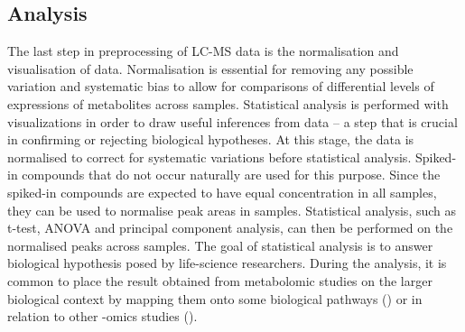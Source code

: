 

\subsection{Analysis}

The last step in preprocessing of LC-MS data is the normalisation and visualisation of data. Normalisation is essential for removing any possible variation and systematic bias to allow for comparisons of differential levels of expressions of metabolites across samples. Statistical analysis is performed with visualizations in order to draw useful inferences from data -- a step that is crucial in confirming or rejecting biological hypotheses. At this stage, the data is normalised to correct for systematic variations before statistical analysis. Spiked-in compounds that do not occur naturally are used for this purpose. Since the spiked-in compounds are expected to have equal concentration in all samples, they can be used to normalise peak areas in samples. Statistical analysis, such as t-test, ANOVA and principal component analysis, can then be performed on the normalised peaks across samples. The goal of statistical analysis is to answer biological hypothesis posed by life-science researchers. During the analysis, it is common to place the result obtained from metabolomic studies on the larger biological context by mapping them onto some biological pathways (\cite{Xia2010,Krumsiek2011a}) or in relation to other -omics studies (\cite{Krumsiek2012,Gieger2008}).


